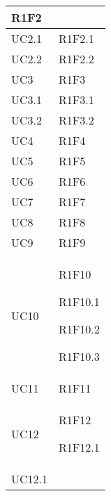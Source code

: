 \begin{center}
\begin{longtable}{|p{44mm}|p{22mm}|}
R1F2 \newline
\\
\hline
UC2.1 &

R1F2.1 \newline
\\
\hline
UC2.2 &

R1F2.2 \newline
\\
\hline
UC3 &

R1F3 \newline
\\
\hline
UC3.1 &

R1F3.1 \newline
\\
\hline
UC3.2 &

R1F3.2 \newline
\\
\hline
UC4 &

R1F4 \newline
\\
\hline
UC5 &

R1F5 \newline
\\
\hline
UC6 &

R1F6 \newline
\\
\hline
UC7 &

R1F7 \newline
\\
\hline
UC8 &

R1F8 \newline
\\
\hline
UC9 &

R1F9 \newline
\\
\hline
UC10 &

R1F10 \newline

R1F10.1 \newline

R1F10.2 \newline

R1F10.3 \newline
\\
\hline
UC11 &

R1F11 \newline
\\
\hline
UC12 &

R1F12 \newline

R1F12.1 \newline
\\
\hline
UC12.1 &


\end{longtable}
\end{center}
